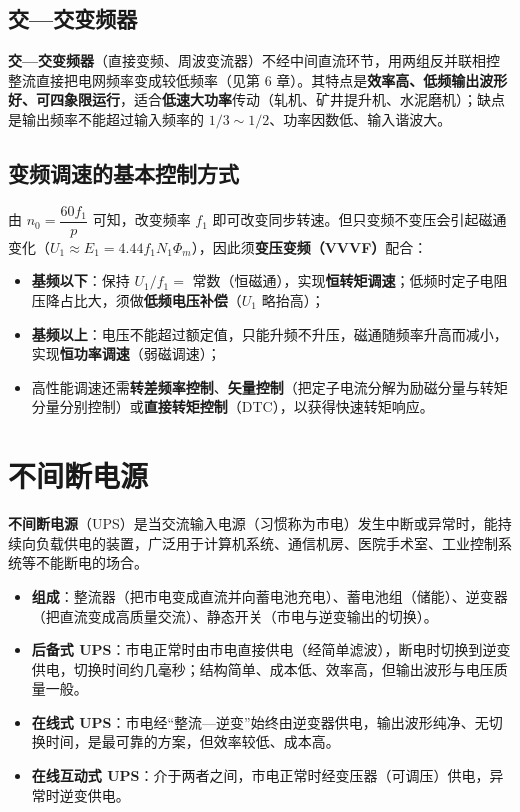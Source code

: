 \subsection{交—交变频器}

\textbf{交—交变频器}（直接变频、周波变流器）不经中间直流环节，用两组反并联相控整流直接把电网频率变成较低频率（见第 6 章）。其特点是\textbf{效率高、低频输出波形好、可四象限运行}，适合\textbf{低速大功率}传动（轧机、矿井提升机、水泥磨机）；缺点是输出频率不能超过输入频率的 $1/3\sim1/2$、功率因数低、输入谐波大。

\subsection{变频调速的基本控制方式}

由 $n_0=\dfrac{60f_1}{p}$ 可知，改变频率 $f_1$ 即可改变同步转速。但只变频不变压会引起磁通变化（$U_1\approx E_1=4.44f_1N_1\Phi_m$），因此须\textbf{变压变频（VVVF）}配合：


\begin{itemize}
  \item \textbf{基频以下}：保持 $U_1/f_1=$ 常数（恒磁通），实现\textbf{恒转矩调速}；低频时定子电阻压降占比大，须做\textbf{低频电压补偿}（$U_1$ 略抬高）；
  \item \textbf{基频以上}：电压不能超过额定值，只能升频不升压，磁通随频率升高而减小，实现\textbf{恒功率调速}（弱磁调速）；
  \item 高性能调速还需\textbf{转差频率控制}、\textbf{矢量控制}（把定子电流分解为励磁分量与转矩分量分别控制）或\textbf{直接转矩控制}（DTC），以获得快速转矩响应。
\end{itemize}

\section{不间断电源}

\textbf{不间断电源}（UPS）是当交流输入电源（习惯称为市电）发生中断或异常时，能持续向负载供电的装置，广泛用于计算机系统、通信机房、医院手术室、工业控制系统等不能断电的场合。

\begin{itemize}
  \item \textbf{组成}：整流器（把市电变成直流并向蓄电池充电）、蓄电池组（储能）、逆变器（把直流变成高质量交流）、静态开关（市电与逆变输出的切换）。
  \item \textbf{后备式 UPS}：市电正常时由市电直接供电（经简单滤波），断电时切换到逆变供电，切换时间约几毫秒；结构简单、成本低、效率高，但输出波形与电压质量一般。
  \item \textbf{在线式 UPS}：市电经“整流—逆变”始终由逆变器供电，输出波形纯净、无切换时间，是最可靠的方案，但效率较低、成本高。
  \item \textbf{在线互动式 UPS}：介于两者之间，市电正常时经变压器（可调压）供电，异常时逆变供电。
\end{itemize}

